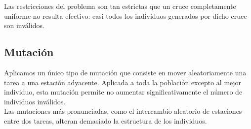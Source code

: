 \documentclass[12pt]{report}
\begin{document}
Las restricciones del problema son tan estrictas que un cruce completamente uniforme no resulta efectivo: casi todos los individuos generados por dicho cruce son inválidos.

\subsection{Mutación}

Aplicamos un único tipo de mutación que consiste en mover aleatoriamente una tarea a una estación adyacente. Aplicada a toda la población excepto al mejor individuo, esta mutación permite no aumentar significativamente el número de individuos inválidos.\\
Las mutaciones más pronunciadas, como el intercambio aleatorio de estaciones entre dos tareas, alteran demasiado la estructura de los individuos.
\end{document}
